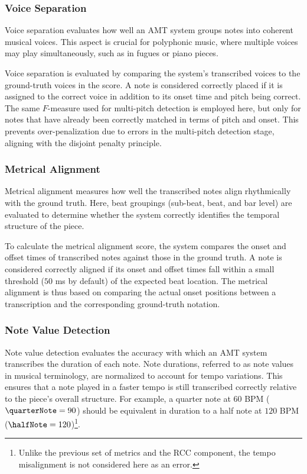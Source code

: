 \subsubsection{Voice Separation}

Voice separation evaluates how well an AMT system groups notes into coherent musical voices. This aspect is crucial for polyphonic music, where multiple voices may play simultaneously, such as in fugues or piano pieces.

Voice separation is evaluated by comparing the system’s transcribed voices to the ground-truth voices in the score. A note is considered correctly placed if it is assigned to the correct voice in addition to its onset time and pitch being correct. The same $F$-measure used for multi-pitch detection is employed here, but only for notes that have already been correctly matched in terms of pitch and onset. This prevents over-penalization due to errors in the multi-pitch detection stage, aligning with the disjoint penalty principle.

\subsubsection{Metrical Alignment}

Metrical alignment measures how well the transcribed notes align rhythmically with the ground truth. Here, beat groupings (sub-beat, beat, and bar level) are evaluated to determine whether the system correctly identifies the temporal structure of the piece.

To calculate the metrical alignment score, the system compares the onset and offset times of transcribed notes against those in the ground truth. A note is considered correctly aligned if its onset and offset times fall within a small threshold ($50$ ms by default) of the expected beat location. The metrical alignment is thus based on comparing the actual onset positions between a transcription and the corresponding ground-truth notation.

\subsubsection{Note Value Detection}

Note value detection evaluates the accuracy with which an AMT system transcribes the duration of each note. Note durations, referred to as note values in musical terminology, are normalized to account for tempo variations. This ensures that a note played in a faster tempo is still transcribed correctly relative to the piece's overall structure. For example, a quarter note at $60$ BPM ($\quarterNote = 90$) should be equivalent in duration to a half note at $120$ BPM ($\halfNote = 120$)\footnote{Unlike the previous set of metrics and the RCC component, the tempo misalignment is not considered here as an error.}.

